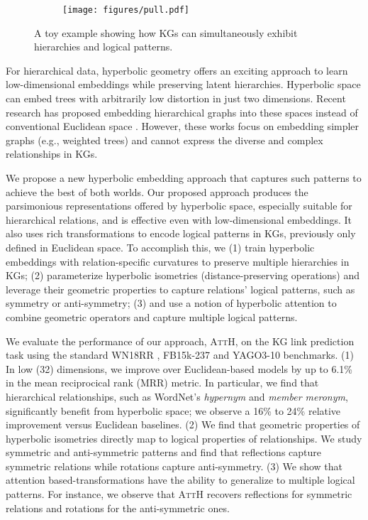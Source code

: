 \documentclass[11pt,a4paper]{article}
\newcommand{\kg}{\textsc{KG}{}}
\newcommand{\model}[1]{\textsc{AttH}}
\begin{document}
\begin{figure}[t]
\centering
\begin{subfigure}[b]{0.85\textwidth}
        \texttt{[image: figures/pull.pdf]}
    \end{subfigure}
\caption{
A toy example showing how KGs can simultaneously exhibit hierarchies and logical patterns. 
}\label{fig:toy_examples}
\end{figure} 
 For hierarchical data, hyperbolic geometry offers an exciting approach to learn low-dimensional embeddings while preserving latent hierarchies. 
Hyperbolic space can embed trees with arbitrarily low distortion in just two dimensions.
Recent research has proposed embedding hierarchical graphs into these spaces instead of conventional Euclidean space \cite{Nickel2017-mw,sala2018representation}. 
However, these works focus on embedding simpler graphs (e.g., weighted trees) and cannot express the diverse and complex relationships in \kg{}s.

We propose a new hyperbolic embedding approach that captures such patterns to achieve the best of both worlds. 
Our proposed approach produces the parsimonious representations offered by hyperbolic space, especially suitable for hierarchical relations, and is effective even with low-dimensional embeddings. 
It also uses rich transformations to encode logical patterns in KGs, previously only defined in Euclidean space. 
To accomplish this, we
(1) train hyperbolic embeddings with relation-specific curvatures to preserve multiple hierarchies in KGs; (2) parameterize hyperbolic isometries (distance-preserving operations) and leverage their geometric properties to capture relations' logical patterns, such as symmetry or anti-symmetry;
(3) and use a notion of hyperbolic attention to combine geometric operators and capture multiple logical patterns.

We evaluate the performance of our approach, \textsc{AttH}, on the KG link prediction task using the standard WN18RR \cite{dettmers2018convolutional,bordes2013translating}, FB15k-237 \cite{toutanova2015observed} and YAGO3-10 \cite{mahdisoltani2013yago3} benchmarks. 
(1) In low (32) dimensions, we improve over Euclidean-based models by up to 6.1\% in the mean reciprocical rank (MRR) metric. 
    In particular, we find that hierarchical relationships, such as WordNet's \textit{hypernym} and \textit{member meronym}, significantly benefit from hyperbolic space; we observe a 16\% to 24\% relative improvement versus Euclidean baselines.
    (2) We find that geometric properties of hyperbolic isometries directly map to logical properties of relationships.
    We study symmetric and anti-symmetric patterns and find that reflections capture symmetric relations while rotations capture anti-symmetry.
    (3) We show that attention based-transformations have the ability to generalize to multiple logical patterns. 
    For instance, we observe that \model{} recovers reflections for symmetric relations and rotations for the anti-symmetric ones.
\end{document}
